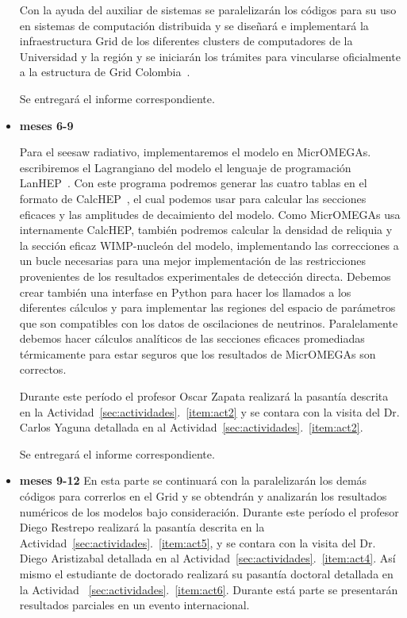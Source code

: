 \begin{itemize}
\begin{gravitinodm}
  Con la ayuda del auxiliar de sistemas se paralelizarán los códigos
  para su uso en sistemas de computación distribuida y se diseñará e
  implementará la infraestructura Grid de los diferentes clusters de
  computadores de la Universidad y la región y se iniciarán los
  trámites para vincularse oficialmente a la estructura de Grid
  Colombia~\cite{gridcolombia}.

  Se entregará el informe correspondiente.
\end{gravitinodm}

\item \textbf{meses 6-9}

\begin{darkmatter}
  Para el seesaw radiativo, implementaremos el modelo en MicrOMEGAs.
  escribiremos el Lagrangiano del modelo el lenguaje de programación
  LanHEP~\cite{Semenov:2008jy}. Con este programa podremos generar las
  cuatro tablas en el formato de CalcHEP~\cite{Pukhov:2004ca}, el cual
  podemos usar para calcular las secciones eficaces y las amplitudes
  de decaimiento del modelo.  Como MicrOMEGAs usa internamente
  CalcHEP, también podremos calcular la densidad de reliquia y la
  sección eficaz WIMP-nucleón del modelo, implementando las
  correcciones a un bucle necesarias para una mejor implementación de
  las restricciones provenientes de los resultados experimentales de
  detección directa. Debemos crear también una interfase en Python
  para hacer los llamados a los diferentes cálculos y para implementar
  las regiones del espacio de parámetros que son compatibles con los
  datos de oscilaciones de neutrinos. Paralelamente debemos hacer
  cálculos analíticos de las secciones eficaces promediadas
  térmicamente para estar seguros que los resultados de MicrOMEGAs son
  correctos.

  Durante este período el profesor Oscar Zapata realizará la pasantía
  descrita en la Actividad~\ref{sec:actividades}.~\ref{item:act2} y se
  contara con la visita del Dr. Carlos Yaguna detallada en al
  Actividad~\ref{sec:actividades}.~\ref{item:act2}.
\end{darkmatter}

  Se entregará el informe correspondiente.

\item \textbf{meses 9-12} En esta parte se continuará con la
  paralelizarán los demás códigos para correrlos en el Grid y se
  obtendrán y analizarán los resultados numéricos de los modelos bajo
  consideración.  Durante este período el profesor Diego Restrepo
  realizará la pasantía descrita en la
  Actividad~\ref{sec:actividades}.~\ref{item:act5}, y se
  contara con la visita del Dr. Diego Aristizabal detallada en al
  Actividad~\ref{sec:actividades}.~\ref{item:act4}. Así mismo el
  estudiante de doctorado realizará su pasantía doctoral detallada en
  la Actividad ~\ref{sec:actividades}.~\ref{item:act6}. Durante está
  parte se presentarán resultados parciales en un evento
  internacional.


\end{itemize}
